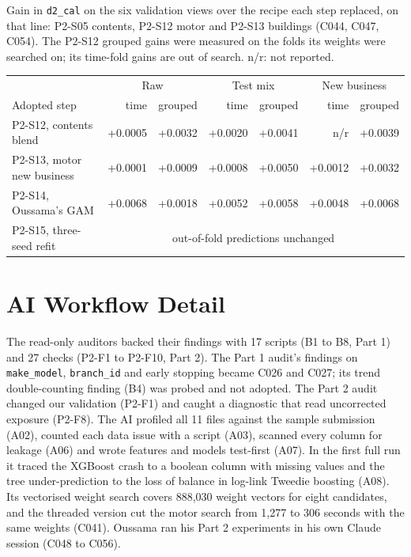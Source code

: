 Gain in \texttt{d2\_cal} on the six validation views over the recipe each step replaced, on that line: P2-S05
contents, P2-S12 motor and P2-S13 buildings (C044, C047, C054). The P2-S12 grouped gains were measured on the folds its
weights were searched on; its time-fold gains are out of search. n/r: not reported.

\begin{center}
\small
\begin{tabular}{lrrrrrr}
\hline
 & \multicolumn{2}{c}{Raw} & \multicolumn{2}{c}{Test mix} & \multicolumn{2}{c}{New business}\\
Adopted step & time & grouped & time & grouped & time & grouped\\
\hline
P2-S12, contents blend & +0.0005 & +0.0032 & +0.0020 & +0.0041 & n/r & +0.0039\\
P2-S13, motor new business & +0.0001 & +0.0009 & +0.0008 & +0.0050 & +0.0012 & +0.0032\\
P2-S14, Oussama's GAM & +0.0068 & +0.0018 & +0.0052 & +0.0058 & +0.0048 & +0.0068\\
P2-S15, three-seed refit & \multicolumn{6}{c}{out-of-fold predictions unchanged}\\
\hline
\end{tabular}
\end{center}

\section{AI Workflow Detail}
\label{ov:app-ai}

The read-only auditors backed their findings with 17 scripts (B1 to B8, Part 1) and 27 checks (P2-F1 to P2-F10,
Part 2). The Part 1 audit's findings on \texttt{make\_model}, \texttt{branch\_id} and early stopping became C026 and
C027; its trend double-counting finding (B4) was probed and not adopted. The Part 2 audit changed our validation
(P2-F1) and caught a diagnostic that read uncorrected exposure (P2-F8). The AI profiled all 11 files against the sample
submission (A02), counted each data issue with a script (A03), scanned every column for leakage (A06) and wrote
features and models test-first (A07). In the first full run it traced the XGBoost crash to a boolean column
with missing values and the tree under-prediction to the loss of balance in log-link Tweedie boosting (A08). Its
vectorised weight search covers 888,030 weight vectors for eight candidates,
and the threaded version cut the motor search from 1,277 to 306 seconds with the same weights (C041). Oussama ran his
Part 2 experiments in his own Claude session (C048 to C056).

